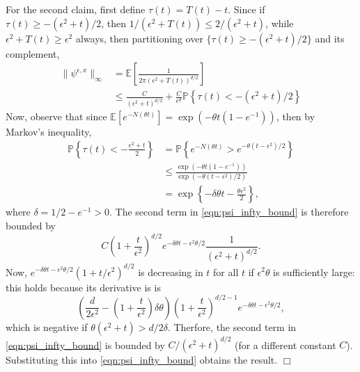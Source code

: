 \documentclass[12pt]{article}
\newenvironment {proof}{{\noindent\bf Proof }}{\hfill $\Box$ \medskip}
\newcommand{\IP}{\mathbb P}
\newcommand{\IE}{\mathbb E}
\begin{document}
\begin{proof}
    For the second claim, first define $\tau(t) = T(t)-t$.
    Since if $\tau(t) \ge -(\epsilon^2 + t)/2$,
    then $1/(\epsilon^2 + T(t)) \le 2/(\epsilon^2 + t)$,
    while $\epsilon^2 + T(t) \ge \epsilon^2$ always,
    then partitioning over
    $\{ \tau(t) \ge -(\epsilon^2 + t)/2 \}$ and its complement,
    \begin{align}
    \| \psi^{\epsilon,x} \|_\infty
    &=
        \IE\left[ 
            \frac{1}{2 \pi (\epsilon^2+T(t))^{d/2}}
        \right] \nonumber
    \\ & \le
        \frac{C}{(\epsilon^2 + t)^{d/2}}
        + 
        \frac{C}{\epsilon^d}
        \IP\left\{
            \tau(t) < - (\epsilon^2 + t) / 2
        \right\} \label{eqn:psi_infty_bound}
    \end{align}
    Now, observe that since $\IE[e^{-N(\theta t)}] = \exp(-\theta t (1 - e^{-1}))$,
    then by Markov's inequality,
    \begin{align*}
        \IP\left\{
            \tau(t) < - \frac{\epsilon^2 + t}{2}
        \right\}
        &=
        \IP\left\{
            e^{-N(\theta t)} > e^{-\theta (t - \epsilon^2) / 2}
        \right\}
        \\&\le
        \frac{
            \exp(- \theta t(1 - e^{-1}))
        }{
            \exp(- \theta (t - \epsilon^2) / 2)
        }
        \\&=
        \exp\left\{ - \delta \theta t - \frac{\theta \epsilon^2}{2} \right\} ,
    \end{align*}
    where $\delta = 1/2 - e^{-1} > 0$.
    The second term in \eqref{eqn:psi_infty_bound} is therefore bounded by
    \[
        C \left(1 + \frac{t}{\epsilon^2}\right)^{d/2} e^{-\delta \theta t - \epsilon^2 \theta / 2}
        \frac{1}{(\epsilon^2 + t)^{d/2}} .
    \]
    Now, $e^{-\delta \theta t - \epsilon^2 \theta / 2} (1 + t/\epsilon^2)^{d/2}$ is decreasing in $t$
    for all $t$ if $\epsilon^2 \theta$ is sufficiently large:
    this holds because its derivative is
    is
    \[
        \left( \frac{d}{2 \epsilon^2} - \left(1 + \frac{t}{\epsilon^2}\right) \delta \theta \right)
        \left( 1 + \frac{t}{\epsilon^2} \right)^{d/2 - 1} e^{-\delta \theta t - \epsilon^2 \theta / 2} ,
    \]
    which is negative if $\theta(\epsilon^2 + t) > d/2 \delta$.
    Therfore, the second term in \eqref{eqn:psi_infty_bound} 
    is bounded by $C / (\epsilon^2 + t)^{d/2}$
    (for a different constant $C$).
    Substituting this into \eqref{eqn:psi_infty_bound} obtains the result.
\end{proof}
\end{document}
